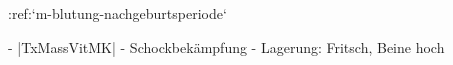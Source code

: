 :ref:`m-blutung-nachgeburtsperiode`
\label{proc:GO72000C}
\begin{itemize}
	-   |TxMassVitMK|
	-   Schockbekämpfung
	-   Lagerung: Fritsch, Beine hoch
\end{itemize}